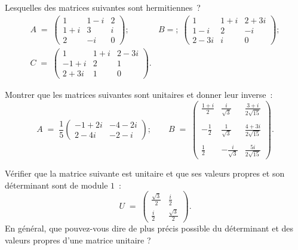 \documentclass[12pt,french,oneside,a4paper]{memoir} %
\begin{document}
\begin{exo}
Lesquelles des matrices suivantes sont hermitiennes~?
\begin{equation*}
\begin{array}{ll}
A \;=\; \left( \begin{array}{ccc}
1 &1-i &2 \\
1+i &3 &i \\
2 &-i &0 \end{array} \right); \qquad 
& B =; \;\left( \begin{array}{ccc}
1 &1+i &2+3i \\
1-i &2 &-i \\
2-3i &i &0 \end{array} \right); \\[6mm]
C \;=\; \left( \begin{array}{ccc}
1 &1+i &2-3i \\
-1+i &2 &1 \\
2+3i &1 &0 \end{array} \right). & 
\end{array}
\end{equation*}
\end{exo}
\begin{exo}
Montrer que les matrices suivantes sont unitaires et donner leur 
inverse~:
\begin{equation*}
A \;=\; \frac{1}{5} \left( \begin{array}{cc}
-1+2i &-4-2i \\
2-4i &-2-i \end{array} \right);
\qquad 
B \;=\;\left( \begin{array}{ccc}
\displaystyle{\frac{1+i}{2}} &\displaystyle{\frac{i}{\sqrt{3}}} 
&\displaystyle{\frac{3+i}{2 \sqrt{15}}} \\
&& \\
\displaystyle{- \frac{1}{2}} &\displaystyle{\frac{1}{\sqrt{3}}} 
&\displaystyle{\frac{4+3i}{2 \sqrt{15}}} \\
&& \\
\displaystyle{\frac{1}{2}} &- \displaystyle{\frac{i}{\sqrt{3}}} 
&\displaystyle{\frac{5i}{2 \sqrt{15}}} 
\end{array} \right).
\end{equation*}
\end{exo}
\begin{exo}
 Vérifier que la matrice suivante est unitaire et que ses valeurs propres et son déterminant sont de module $1$~:
\begin{equation*}
U \;=\; \left( \begin{array}{cc}
\frac{\sqrt{3}}{2} &\frac{i}{2} \\
\frac{i}{2} &\frac{\sqrt{3}}{2} \end{array} \right).
\end{equation*}
En général, que pouvez-vous dire de plus précis possible du déterminant et des valeurs propres d'une matrice unitaire ?
\end{exo}
\end{document}
